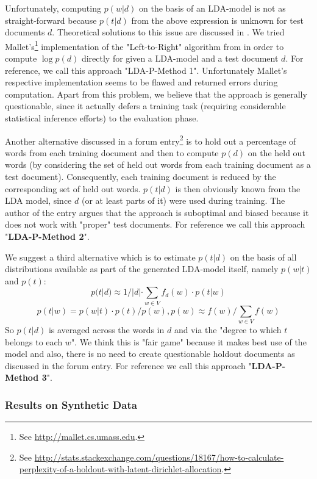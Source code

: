 \documentclass[10pt, a4paper, oneside]{article}
\begin{document}
Unfortunately, computing $p(w|d)$ on the basis of an LDA-model is not as straight-forward because $p(t|d)$ from the above expression is unknown for test documents $d$.
Theoretical solutions to this issue are discussed in \cite{Wallach:2009:EMT:1553374.1553515}.
We tried Mallet's\footnote{See \href{http://mallet.cs.umass.edu}{http://mallet.cs.umass.edu}.} implementation of the "Left-to-Right" algorithm from \cite{wallach08} in order to compute $\log p(d)$ directly for given a LDA-model and a test document $d$. For reference, we call this approach "LDA-P-Method 1". Unfortunately Mallet's respective implementation seems to be flawed and returned errors during computation.
Apart from this problem, we believe that the approach is generally questionable, since it actually defers a training task (requiring considerable statistical inference efforts) to the evaluation phase.

Another alternative discussed in a forum entry\footnote{See \href{http://stats.stackexchange.com/questions/18167/how-to-calculate-perplexity-of-a-holdout-with-latent-dirichlet-allocation}{{http://stats.stackexchange.com/questions/18167/how-to-calculate-perplexity-of-a-holdout-with-latent-dirichlet-allocation}}.} is to hold out a percentage of words from each training document and then to compute $p(d)$ on the held out words (by considering the set of held out words from each training document as a test document). Consequently, each training document is reduced by the corresponding set of held out words. $p(t|d)$ is then obviously known from the LDA model, since $d$ (or at least parts of it) were used during training. The author of the entry argues that the approach is suboptimal and biased because it does not work with "proper" test documents. For reference we call this approach "\textbf{LDA-P-Method 2}".

We suggest a third alternative which is to estimate $p(t|d)$ on the basis of all distributions available as part of the generated LDA-model itself, namely
$p(w|t)$ and $p(t)$:
\[ p(t|d) \approx 1 / |d| \cdot \sum_{w \in V} f_d(w) \cdot p(t|w)\]
\[ p(t|w) = p(w|t) \cdot p(t) / p(w), p(w) \approx f(w) / \sum_{w \in V} f(w)\]
So $p(t|d)$ is averaged across the words in $d$ and via the "degree to which $t$ belongs to each $w$".
We think this is "fair game" because it makes best use of the model and also, there is no need to create questionable holdout documents as discussed in the forum entry. For reference we call this approach "\textbf{LDA-P-Method 3}".

\subsubsection{Results on Synthetic Data}
\end{document}

